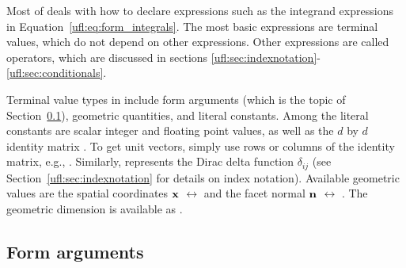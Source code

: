 Most of \ufl{} deals with how to declare expressions such as the
integrand expressions in Equation~\ref{ufl:eq:form_integrals}.  The
most basic expressions are terminal values, which do not depend on
other expressions.  Other expressions are called operators, which are
discussed in sections
\ref{ufl:sec:indexnotation}-\ref{ufl:sec:conditionals}.

Terminal value types in \ufl{} include form arguments (which is the
topic of Section~\ref{ufl:sec:arguments}), geometric quantities, and
literal constants.  Among the literal constants are scalar integer and
floating point values, as well as the $d$ by $d$ identity matrix
.  To get unit vectors, simply use rows or
columns of the identity matrix, e.g., .  Similarly,
 represents the Dirac delta function $\delta_{ij}$ (see
Section~\ref{ufl:sec:indexnotation} for details on index notation).
Available geometric values are the spatial coordinates $\mathbf{x}$
$\leftrightarrow$  and the facet normal $\mathbf{n}$
$\leftrightarrow$ .  The geometric dimension is
available as .

\subsection{Form arguments} \label{ufl:sec:arguments}

